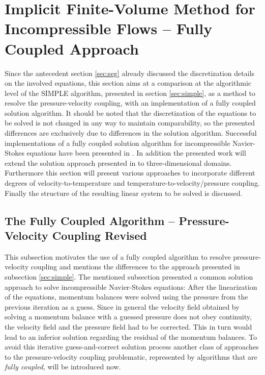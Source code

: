 \section{Implicit Finite-Volume Method for Incompressible Flows -- Fully Coupled Approach}
\label{sec:cpld}

Since the antecedent section \ref{sec:seg} already discussed the discretization details on the involved equations, this section aims at a comparison at the algorithmic level of the SIMPLE algorithm, presented in section \ref{sec:simple}, as a method to resolve the pressure-velocity coupling, with an implementation of a fully coupled solution algorithm. It should be noted that the discretization of the equations to be solved is not changed in any way to maintain comparability, so the presented differences are exclusively due to differences in the solution algorithm. Successful implementations of a fully coupled solution algorithm for incompressible Navier-Stokes equations have been presented in \cite{chen10,darwish09,falk13,vakilipour12}. In addition the presented work will extend the solution approach presented in \cite{falk13} to three-dimensional domains. Furthermore this section will present various approaches to incorporate different degrees of velocity-to-temperature and temperature-to-velocity/pressure coupling. Finally the structure of the resulting linear system to be solved is discussed.

\subsection{The Fully Coupled Algorithm -- Pressure-Velocity Coupling Revised}

This subsection motivates the use of a fully coupled algorithm to resolve pressure-velocity coupling and mentions the differences to the approach presented in subsection \ref{sec:simple}. The mentioned subsection presented a common solution approach to solve incompressible Navier-Stokes equations: After the linearization of the equations, momentum balances were solved using the pressure from the previous iteration as a guess. Since in general the velocity field obtained by solving a momentum balance with a guessed pressure does not obey continuity, the velocity field and the pressure field had to be corrected. This in turn would lead to an inferior solution regarding the residual of the momentum balances. To avoid this iterative guess-and-correct solution process another class of approaches to the pressure-velocity coupling problematic, represented by algorithms that are \emph{fully coupled}, will be introduced now.

